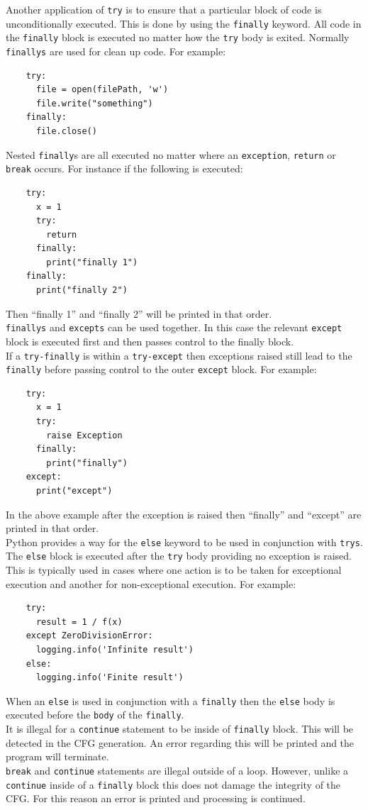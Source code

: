 \documentclass[12pt, titlepage]{article}
\begin{document}
\indent Another application of \texttt{try} is to ensure that a particular block of code is unconditionally executed. This is done by using the \texttt{finally} keyword. All code in the \texttt{finally} block is executed no matter how the \texttt{try} body is exited. Normally \texttt{finallys} are used for clean up code. For example:
\begin{lstlisting}
    try:
      file = open(filePath, 'w')
      file.write("something")
    finally:
      file.close()
\end{lstlisting}
\indent Nested \texttt{finally}s are all executed no matter where an \texttt{exception}, \texttt{return} or \texttt{break} occurs. For instance if the following is executed:
\begin{lstlisting}
    try:
      x = 1
      try:
        return
      finally:
        print("finally 1")
    finally:
      print("finally 2")
\end{lstlisting}
Then ``finally 1'' and ``finally 2'' will be printed in that order. \\
\indent \texttt{finallys} and \texttt{excepts} can be used together. In this case the relevant \texttt{except} block is executed first and then passes control to the finally block. \\
\indent If a \texttt{try-finally} is within a \texttt{try-except} then exceptions raised still lead to the \texttt{finally} before passing control to the outer \texttt{except} block. For example:
\begin{lstlisting}
    try:
      x = 1
      try:
        raise Exception
      finally:
        print("finally")
    except:
      print("except")
\end{lstlisting}
In the above example after the exception is raised then ``finally'' and ``except'' are printed in that order. \\
\indent Python provides a way for the \texttt{else} keyword to be used in conjunction with \texttt{trys}. The \texttt{else} block is executed after the \texttt{try} body providing no exception is raised. This is typically used in cases where one action is to be taken for exceptional execution and another for non-exceptional execution. For example:
\begin{lstlisting}
    try:
      result = 1 / f(x)
    except ZeroDivisionError:
      logging.info('Infinite result')
    else:
      logging.info('Finite result')
\end{lstlisting}
When an \texttt{else} is used in conjunction with a \texttt{finally} then the \texttt{else} body is executed before the \texttt{body} of the \texttt{finally}. \\
\indent It is illegal for a \texttt{continue} statement to be inside of \texttt{finally} block. This will be detected in the CFG generation. An error regarding this will be printed and the program will terminate. \\
\indent \texttt{break} and \texttt{continue} statements are illegal outside of a loop. However, unlike a \texttt{continue} inside of a \texttt{finally} block this does not damage the integrity of the CFG. For this reason an error is printed and processing is continued.
\end{document}
